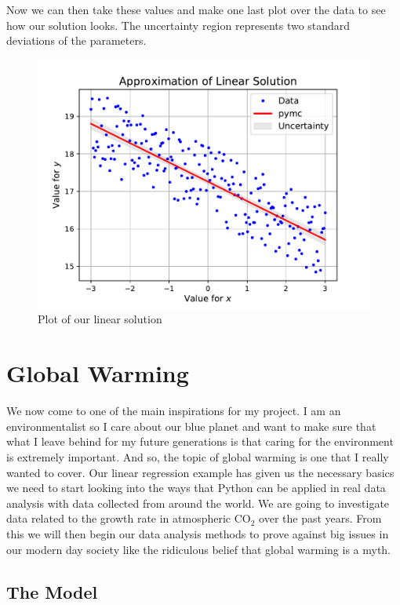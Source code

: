 \documentclass[12pt,twoside]{report}   %
\begin{document}
Now we can then take these values and make one last plot over the data to see how our solution looks. The uncertainty region represents two standard deviations of the parameters.
\begin{figure}[H]
\centering
\includegraphics[width = 5in]{Finalgraph.pdf}
\caption{Plot of our linear solution}
\label{figFinalGraph1}
\end{figure}

\chapter{Global Warming}\label{Global Warming}

We now come to one of the main inspirations for my project. I am an environmentalist so I care about our blue planet and want to make sure that what I leave behind for my future generations is that caring for the environment is extremely important. And so, the topic of global warming is one that I really wanted to cover. Our linear regression example has given us the necessary basics we need to start looking into the ways that Python can be applied in real data analysis with data collected from around the world. We are going to investigate data related to the growth rate in atmospheric $\mathrm{CO_2}$ over the past years. From this we will then begin our data analysis methods to prove against big issues in our modern day society like the ridiculous belief that global warming is a myth.

\section{The Model}\label{The Model3}
\end{document}
